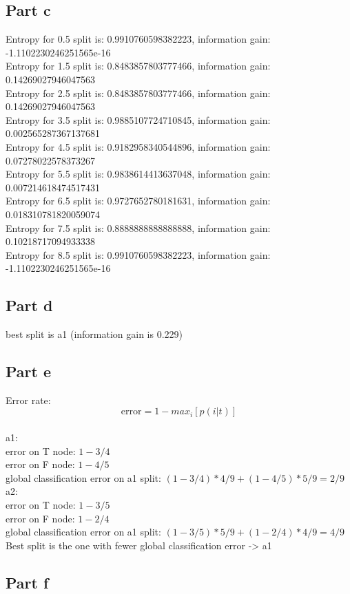 \documentclass[a4paper, 10pt]{article}
\begin{document}
\subsection{Part c}
Entropy for 0.5 split is: 0.9910760598382223, information gain: -1.1102230246251565e-16
\\
Entropy for 1.5 split is: 0.8483857803777466, information gain: 0.14269027946047563
\\
Entropy for 2.5 split is: 0.8483857803777466, information gain: 0.14269027946047563
\\
Entropy for 3.5 split is: 0.9885107724710845, information gain: 0.002565287367137681
\\
Entropy for 4.5 split is: 0.9182958340544896, information gain: 0.07278022578373267
\\
Entropy for 5.5 split is: 0.9838614413637048, information gain: 0.007214618474517431
\\
Entropy for 6.5 split is: 0.9727652780181631, information gain: 0.018310781820059074
\\
Entropy for 7.5 split is: 0.8888888888888888, information gain: 0.10218717094933338
\\
Entropy for 8.5 split is: 0.9910760598382223, information gain: -1.1102230246251565e-16

\subsection{Part d}

best split is a1 (information gain is 0.229)

\subsection{Part e}
Error rate:
$$
\text{error} = 1 - {max}_i [p(i\vert t)]
$$
\\
a1: 
\\
error on T node: $1-3/4$
\\
error on F node: $1-4/5$
\\
global classification error on a1 split: $ (1-3/4)*4/9 + (1-4/5)*5/9 = 2/9$
\\
a2: 
\\
error on T node: $1-3/5$
\\
error on F node: $1-2/4$
\\
global classification error on a1 split: $ (1-3/5)*5/9 + (1-2/4)*4/9 = 4/9$
\\
Best split is the one with fewer global classification error -> a1


\subsection{Part f}
\end{document}
